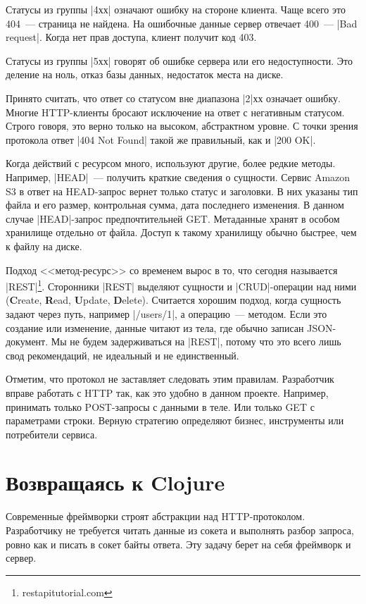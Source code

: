 Статусы из группы \spverb|4хх| означают ошибку на стороне клиента. Чаще всего это 404~---
страница не найдена. На ошибочные данные сервер отвечает 400~--- \spverb|Bad request|.
Когда нет прав доступа, клиент получит код 403.

Статусы из группы \spverb|5хх| говорят об ошибке сервера или его
недоступности. Это деление на ноль, отказ базы данных, недостаток места
на диске.

Принято считать, что ответ со статусом вне диапазона \spverb|2|хх означает
ошибку. Многие HTTP-клиенты бросают исключение на ответ с негативным статусом.
Строго говоря, это верно только на высоком, абстрактном уровне. С точки
зрения протокола ответ \spverb|404 Not Found| такой же правильный, как и \spverb|200 OK|.

Когда действий с ресурсом много, используют другие, более редкие
методы. Например, \spverb|HEAD|~--- получить краткие сведения о сущности. Сервис
Amazon S3 в ответ на HEAD-запрос вернет только статус и заголовки. В них указаны
тип файла и его размер, контрольная сумма, дата последнего изменения. В данном
случае \spverb|HEAD|-запрос предпочтительней GET. Метаданные хранят в особом
хранилище отдельно от файла. Доступ к такому хранилищу обычно быстрее, чем к
файлу на диске.

Подход <<метод-ресурс>> со временем вырос в то, что сегодня называется
\spverb|REST|\footnote{restapitutorial.com}. Сторонники
\spverb|REST| выделяют сущности и \spverb|CRUD|-операции над ними (\textbf{C}reate,
\textbf{R}ead, \textbf{U}pdate, \textbf{D}elete). Считается хорошим подход,
когда сущность задают через путь, например \spverb|/users/1|, а операцию~---
методом. Если это создание или изменение, данные читают из тела, где обычно записан
JSON-документ. Мы не будем задерживаться на \spverb|REST|, потому что это всего лишь
свод рекомендаций, не идеальный и не единственный.

Отметим, что протокол не заставляет следовать этим правилам. Разработчик вправе
работать с HTTP так, как это удобно в данном проекте. Например, принимать только
POST-запросы с данными в теле. Или только GET с параметрами строки. Верную
стратегию определяют бизнес, инструменты или потребители сервиса.


\section{Возвращаясь к Clojure}

Современные фреймворки строят абстракции над HTTP-протоколом. Разработчику не
требуется читать данные из сокета и выполнять разбор запроса, ровно как и писать
в сокет байты ответа. Эту задачу берет на себя фреймворк и сервер.

